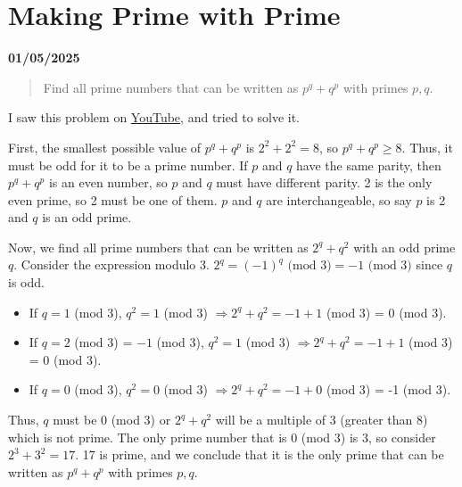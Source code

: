 \documentclass[12pt, oneside]{article}
\begin{document}
\section*{Making Prime with Prime}
\textbf{01/05/2025}
\begin{quote}
Find all prime numbers that can be written as $p^q+q^p$ with primes $p, q$.
\end{quote}
I saw this problem on \href{https://youtu.be/a_jRo2_scLI}{YouTube}, and tried to solve it.

First, the smallest possible value of $p^q + q^p$ is $2^2 + 2^2 = 8$, so $p^q + q^p \geq 8$. Thus, it must be odd for it to be a prime number. If $p$ and $q$ have the same parity, then $p^q + q^p$ is an even number, so $p$ and $q$ must have different parity. 2 is the only even prime, so 2 must be one of them. $p$ and $q$ are interchangeable, so say $p$ is 2 and $q$ is an odd prime.

Now, we find all prime numbers that can be written as $2^q + q^2$ with an odd prime $q$. Consider the expression modulo 3. $2^q = (-1)^q \text{ (mod } 3)= -1 \text{ (mod } 3)$ since $q$ is odd.
\begin{itemize}
\item If $q = 1$ (mod 3), $q^2 = 1$ (mod 3) $\Rightarrow 2^q + q^2 = -1 + 1$ (mod 3) = 0 (mod 3).
\item If $q = 2$ (mod 3) = $-1$ (mod 3), $q^2 = 1$ (mod 3) $\Rightarrow 2^q + q^2 = -1 + 1$ (mod 3) = 0 (mod 3).
\item If $q = 0$ (mod 3), $q^2 = 0$ (mod 3) $\Rightarrow 2^q + q^2 = -1 + 0$ (mod 3) = -1 (mod 3).
\end{itemize}
Thus, $q$ must be 0 (mod 3) or $2^q + q^2$ will be a multiple of 3 (greater than 8) which is not prime. The only prime number that is 0 (mod 3) is 3, so consider $2^3 + 3^2 = 17$. 17 is prime, and we conclude that it is the only prime that can be written as $p^q + q^p$ with primes $p, q$. 
\end{document}
